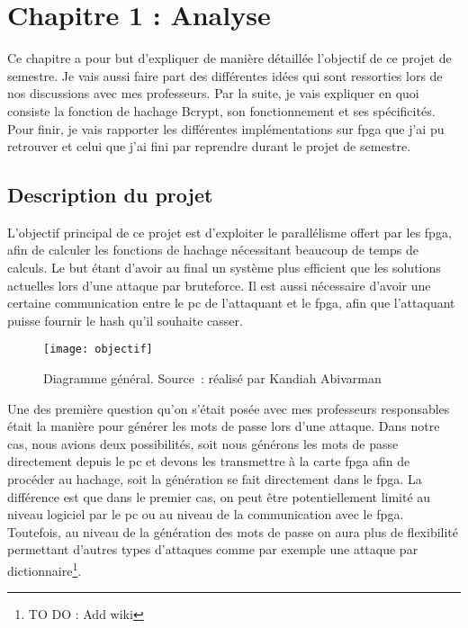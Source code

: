 \chapter{Chapitre 1 : Analyse}

Ce chapitre a pour but d'expliquer de manière détaillée l'objectif de ce projet de semestre. Je vais aussi faire part des différentes idées qui sont ressorties lors de nos discussions avec mes professeurs. Par la suite, je vais expliquer en quoi consiste la fonction de hachage Bcrypt, son fonctionnement et ses spécificités. Pour finir, je vais rapporter les différentes implémentations sur \gls{fpga} que j'ai pu retrouver et celui que j'ai fini par reprendre durant le projet de semestre. 

\section{Description du projet}

L'objectif principal de ce projet est d'exploiter le parallélisme offert par les \gls{fpga}, afin de calculer les fonctions de hachage nécessitant beaucoup de temps de calculs. Le but étant d'avoir au final un système plus efficient que les solutions actuelles lors d'une attaque par bruteforce. Il est aussi nécessaire d'avoir une certaine communication entre le \gls{pc} de l'attaquant et le \gls{fpga}, afin que l'attaquant puisse fournir le hash qu'il souhaite casser.

\begin{figure}[tbph!]
	\centering
	\texttt{[image: objectif]}
	\caption[Diagramme général]{Diagramme général. Source : réalisé par Kandiah Abivarman}
	\label{fig:objectif}
\end{figure}

Une des première question qu'on s'était posée avec mes professeurs responsables était la manière pour générer les mots de passe lors d'une attaque. Dans notre cas, nous avions deux possibilités, soit nous générons les mots de passe directement depuis le \gls{pc} et devons les transmettre à la carte \gls{fpga} afin de procéder au hachage, soit la génération se fait directement dans le \gls{fpga}. La différence est que dans le premier cas, on peut être potentiellement limité au niveau logiciel par le \gls{pc} ou au niveau de la communication avec le \gls{fpga}. Toutefois, au niveau de la génération des mots de passe on aura plus de flexibilité permettant d'autres types d'attaques comme par exemple une attaque par dictionnaire\footnote{TO DO : Add wiki}.

